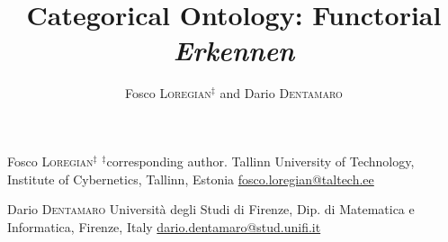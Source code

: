 \documentclass[a4paper,9pt]{../birkjour}
\title{Categorical Ontology: Functorial \emph{Erkennen}}
\author{Fosco \textsc{Loregian}$^\ddag$ and Dario \textsc{Dentamaro}}
\begin{document}
\scriptsize

\maketitle

\begin{minipage}{.4\textwidth}
  Fosco \textsc{Loregian}$^\ddag$\newline 
  $^\ddag$corresponding author. \newline 
Tallinn University of Technology,\newline %
Institute of Cybernetics,\newline 
Tallinn, Estonia \newline
\url{fosco.loregian@taltech.ee}
\end{minipage}\hfill %
\begin{minipage}{.4\textwidth}
  Dario \textsc{Dentamaro} \newline 
  Università degli Studi di Firenze,\newline 
  Dip. di Matematica e Informatica, \newline 
  Firenze, Italy\newline
  \url{dario.dentamaro@stud.unifi.it}
\end{minipage}
\end{document}
